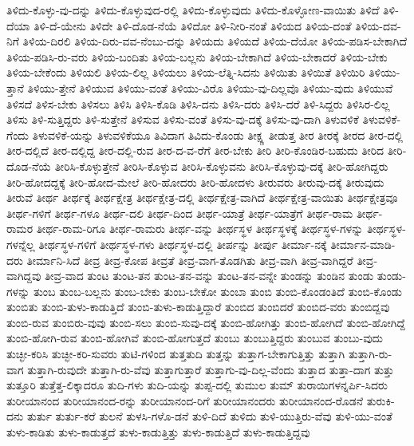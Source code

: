 {ತಿಳಿದು-ಕೊಳ್ಳು-ವು-ದನ್ನು
ತಿಳಿದು-ಕೊಳ್ಳುವುದ-ರಲ್ಲಿ
ತಿಳಿದು-ಕೊಳ್ಳುವುದು
ತಿಳಿದು-ಕೊಳ್ಳೋಣ-ವಾಯಿತು
ತಿಳಿದೆ
ತಿಳಿ-ದೆಯಾ
ತಿಳಿ-ದೆ-ಯೇನು
ತಿಳಿದೇ
ತಿಳಿ-ದೊಡ-ನೆಯೆ
ತಿಳಿದೋ
ತಿಳಿ-ನೀರಿ-ನಂತೆ
ತಿಳಿಯದ
ತಿಳಿಯ-ದಂತೆ
ತಿಳಿಯ-ದವ-ನಿಗೆ
ತಿಳಿಯ-ದಿರಲಿ
ತಿಳಿಯ-ದಿರು-ವವ-ನೆಂಬು-ದನ್ನು
ತಿಳಿಯದು
ತಿಳಿಯದೆ
ತಿಳಿಯ-ದೆಯೋ
ತಿಳಿಯ-ಪಡಿಸ-ಬೇಕಾಗಿದೆ
ತಿಳಿಯ-ಪಡಿಸಿ-ರು-ವರು
ತಿಳಿಯ-ಬಂದಿತು
ತಿಳಿಯ-ಬಲ್ಲನು
ತಿಳಿಯ-ಬೇಕಾಗಿದೆ
ತಿಳಿಯ-ಬೇಕಾದರೆ
ತಿಳಿಯ-ಬೇಕು
ತಿಳಿಯ-ಬೇಕೆಂದು
ತಿಳಿಯಲಿ
ತಿಳಿಯ-ಲಿಲ್ಲ
ತಿಳಿಯಲು
ತಿಳಿಯ-ಲೆತ್ನಿ-ಸಿದನು
ತಿಳಿಯಿತು
ತಿಳಿಯಿತೆ
ತಿಳಿಯಿರಿ
ತಿಳಿಯು-ತ್ತಾನೆ
ತಿಳಿಯು-ತ್ತೇನೆ
ತಿಳಿಯುವ
ತಿಳಿಯು-ವಂತೆ
ತಿಳಿಯು-ವಿರೊ
ತಿಳಿಯು-ವು-ದಿಲ್ಲವೊ
ತಿಳಿಯು-ವುದು
ತಿಳಿಯುವೆ
ತಿಳಿಸದೆ
ತಿಳಿಸ-ಬೇಕು
ತಿಳಿಸಲು
ತಿಳಿಸಿ
ತಿಳಿಸಿ-ಕೊಡಿ
ತಿಳಿಸಿ-ದನು
ತಿಳಿಸಿ-ದರು
ತಿಳಿಸಿ-ದರೆ
ತಿಳಿ-ಸಿದ್ದರು
ತಿಳಿಸಿರ-ಲಿಲ್ಲ
ತಿಳಿಸು
ತಿಳಿ-ಸುತ್ತಿದ್ದರು
ತಿಳಿ-ಸುತ್ತೇನೆ
ತಿಳಿಸುವ
ತಿಳಿಸು-ವಂತೆ
ತಿಳಿಸು-ವು-ದಕ್ಕೆ
ತಿಳಿಸು-ವು-ದಾಗಿ
ತಿಳುವಳಿಕೆ
ತಿಳುವಳಿಕೆ-ಗೆಂದು
ತಿಳುವಳಿಕೆ-ಯನ್ನು
ತಿಳುವಳಿಕೆಯೂ
ತಿವಿದಾಗ
ತಿವಿದು-ಕೊಂಡು
ತೀಕ್ಷ್ಣ
ತೀಡುತ್ತ
ತೀರ
ತೀರಕ್ಕೆ
ತೀರದ
ತೀರ-ದಲ್ಲಿ
ತೀರ-ದಲ್ಲಿದೆ
ತೀರ-ದಲ್ಲಿದ್ದ
ತೀರ-ದಲ್ಲಿ-ರುವ
ತೀರ-ದ-ವ-ರೆಗೆ
ತೀರ-ಬೇಕು
ತೀರಿ
ತೀರಿ-ಕೊಂಡಿರ-ಬಹುದು
ತೀರಿದ
ತೀರಿ-ದೊಡ-ನೆಯೆ
ತೀರಿಸಿ-ಕೊಳ್ಳುತ್ತೇನೆ
ತೀರಿಸಿ-ಕೊಳ್ಳುವ
ತೀರಿಸಿ-ಕೊಳ್ಳುವನು
ತೀರಿಸಿ-ಕೊಳ್ಳುವು-ದಕ್ಕೆ
ತೀರಿ-ಹೋಗಿದ್ದರು
ತೀರಿ-ಹೋದದ್ದಕ್ಕೆ
ತೀರಿ-ಹೋದ-ಮೇಲೆ
ತೀರಿ-ಹೋದರು
ತೀರಿ-ಹೋದಳು
ತೀರುವರು
ತೀರುವು-ದಕ್ಕೆ
ತೀರುವುದು
ತೀರುವೆ
ತೀರ್ಥ
ತೀರ್ಥಕ್ಕೆ
ತೀರ್ಥಕ್ಷೇತ್ರ
ತೀರ್ಥಕ್ಷೇತ್ರ-ದಲ್ಲಿ
ತೀರ್ಥಕ್ಷೇತ್ರ-ವಾಗಿದೆ
ತೀರ್ಥಕ್ಷೇತ್ರ-ವಾಯಿತು
ತೀರ್ಥಕ್ಷೇತ್ರವೂ
ತೀರ್ಥ-ಗಳಿಗೆ
ತೀರ್ಥ-ಗಳೂ
ತೀರ್ಥ-ದಲಿ
ತೀರ್ಥ-ದಿಂದ
ತೀರ್ಥ-ಯಾತ್ರೆ
ತೀರ್ಥ-ಯಾತ್ರೆಗೆ
ತೀರ್ಥ-ರಾಮ
ತೀರ್ಥ-ರಾಮರ
ತೀರ್ಥ-ರಾಮ-ರಿಗೂ
ತೀರ್ಥ-ರಾಮರು
ತೀರ್ಥ-ವನ್ನು
ತೀರ್ಥಸ್ಥಳ
ತೀರ್ಥಸ್ಥಳಕ್ಕೆ
ತೀರ್ಥಸ್ಥಳ-ಗಳನ್ನು
ತೀರ್ಥಸ್ಥಳ-ಗಳನ್ನೆಲ್ಲ
ತೀರ್ಥಸ್ಥಳ-ಗಳಿಗೆ
ತೀರ್ಥಸ್ಥಳ-ಗಳು
ತೀರ್ಥಸ್ಥಳ-ದಲ್ಲಿ
ತೀರ್ಪನ್ನು
ತೀರ್ಪು
ತೀರ್ಮಾ-ನಕ್ಕೆ
ತೀರ್ಮಾನ-ಮಾಡಿ-ದರು
ತೀರ್ಮಾನಿ-ಸಿದೆ
ತೀವ್ರ
ತೀವ್ರ-ಕೋಪ
ತೀವ್ರತೆ
ತೀವ್ರ-ವಾಗ-ತೊಡಗಿತು
ತೀವ್ರ-ವಾಗಿ
ತೀವ್ರ-ವಾಗಿದ್ದರೆ
ತೀವ್ರ-ವಾಗಿದ್ದವು
ತೀವ್ರ-ವಾದ
ತುಂಟ
ತುಂಟ-ತನ
ತುಂಟ-ತನ-ವನ್ನು
ತುಂಟ-ತನ-ವನ್ನೇ
ತುಂಡನ್ನು
ತುಂಡಿನ
ತುಂಡು
ತುಂಡು-ಗಳನ್ನು
ತುಂಬ
ತುಂಬ-ಬಲ್ಲನು
ತುಂಬ-ಬೇಕು
ತುಂಬ-ಬೇಕೋ
ತುಂಬಾ
ತುಂಬಿ
ತುಂಬಿ-ಕೊಂಡಂತಿದೆ
ತುಂಬಿ-ಕೊಂಡು
ತುಂಬಿತು
ತುಂಬಿ-ತುಳು-ಕಾಡುತ್ತಿದೆ
ತುಂಬಿ-ತುಳು-ಕಾಡುತ್ತಿದ್ದಾರೆ
ತುಂಬಿದ
ತುಂಬಿದರೆ
ತುಂಬಿದ-ವರು
ತುಂಬಿದ್ದವು
ತುಂಬಿ-ರುವ
ತುಂಬಿರು-ವುವು
ತುಂಬಿ-ಸಲು
ತುಂಬಿ-ಸುವು-ದಕ್ಕೆ
ತುಂಬಿ-ಹೋಗಿತ್ತು
ತುಂಬಿ-ಹೋಗಿದೆ
ತುಂಬಿ-ಹೋಗಿದ್ದೆ
ತುಂಬಿ-ಹೋಗಿ-ರುವ
ತುಂಬಿ-ಹೋಗಿವೆ
ತುಂಬಿ-ಹೋಗುತ್ತದೆ
ತುಂಬು
ತುಂಬುತ್ತಿದ್ದರು
ತುಂಬುವ
ತುಂಬು-ವುದು
ತುಚ್ಛೀ-ಕರಿಸಿ
ತುಚ್ಛೀ-ಕರಿ-ಸುವರು
ತುಟಿ-ಗಳಿಂದ
ತುತ್ತತುದಿ
ತುತ್ತನ್ನು
ತುತ್ತಾಗ-ಬೇಕಾಗುತ್ತಿತ್ತು
ತುತ್ತಾಗಿ
ತುತ್ತಾಗಿ-ರು-ವಾಗ
ತುತ್ತಾಗಿ-ರುವುದೇ
ತುತ್ತಾಗಿ-ರು-ವೆವು
ತುತ್ತಾಗುತ್ತಾರೆ
ತುತ್ತಾಗು-ವು-ದಿಲ್ಲ-ವೆಂದು
ತುತ್ತಾದ
ತುತ್ತಾ-ದಾಗ
ತುತ್ತು
ತುತ್ತೂರಿ
ತುತ್ತೆತ್ತ-ಲಿಕ್ಕಾದರೂ
ತುದಿ-ಗಳು
ತುದಿ-ಯನ್ನು
ತುಪ್ಪ-ದಲ್ಲಿ
ತುಮುಲ
ತುಮ್
ತುರಾಯಿಗಳನ್ನರ್ಪಿ-ಸಿದರು
ತುರೀಯಾನಂದ
ತುರೀಯಾನಂದ-ರನ್ನು
ತುರೀಯಾನಂದ-ರಿಗೆ
ತುರೀಯಾನಂದರು
ತುರೀಯಾನಂದ-ರೊಡನೆ
ತುರುಕಿ-ದನು
ತುರ್ತು
ತುರ್ತು-ಕರೆ
ತುಲನೆ
ತುಳಸಿ-ಗಳೊ-ಡನೆ
ತುಳಿ-ದಿದೆ
ತುಳಿದು
ತುಳಿ-ಯುತ್ತಿರು-ವೆವು
ತುಳಿ-ಯು-ವಂತೆ
ತುಳು-ಕಾಡಿತು
ತುಳು-ಕಾಡುತ್ತದೆ
ತುಳು-ಕಾಡುತ್ತಿತ್ತು
ತುಳು-ಕಾಡುತ್ತಿದೆ
ತುಳು-ಕಾಡುತ್ತಿದ್ದವು
}
